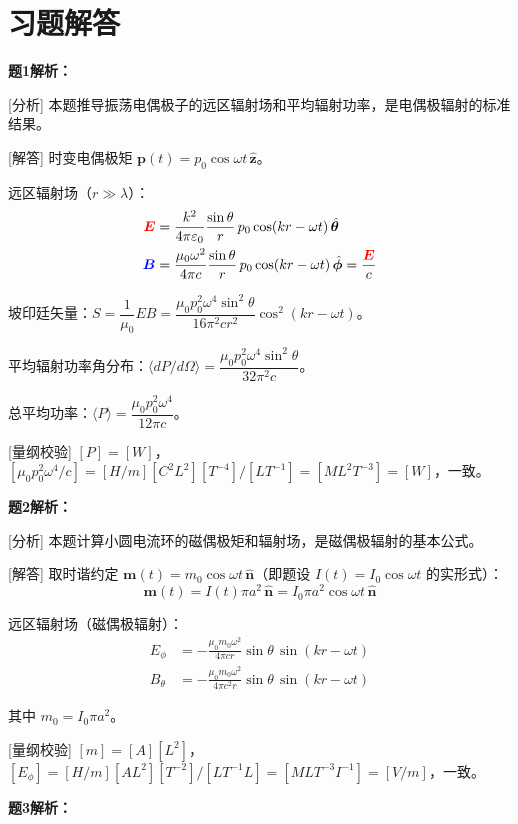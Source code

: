 \documentclass[11pt,a4paper,openany,oneside]{book}
\newcommand{\vecE}{\textcolor{red}{\vect{E}}}
\newcommand{\vecB}{\textcolor{blue}{\vect{B}}}
\newcommand{\eps}{\varepsilon}
\newcommand{\muz}{\mu_0}
\newcommand{\vect}[1]{\bm{#1}}
\newcommand{\unitvec}[1]{\hat{\vect{#1}}}
\begin{document}
\section*{习题解答}

\textbf{题1解析：}

[分析] 本题推导振荡电偶极子的远区辐射场和平均辐射功率，是电偶极辐射的标准结果。

[解答] 时变电偶极矩 $\vect{p}(t) = p_0\cos\omega t\,\unitvec{z}$。

远区辐射场（$r \gg \lambda$）：
\begin{align*}
\vecE &= \frac{k^2}{4\pi\eps_0}\frac{\sin\theta}{r}\,p_0\cos(kr - \omega t)\,\unitvec{\theta} \\
\vecB &= \frac{\muz\omega^2}{4\pi c}\frac{\sin\theta}{r}\,p_0\cos(kr - \omega t)\,\unitvec{\phi} = \frac{\vecE}{c}
\end{align*}

坡印廷矢量：$S = \dfrac{1}{\muz}EB = \dfrac{\muz p_0^2\omega^4\sin^2\theta}{16\pi^2 c r^2}\cos^2(kr - \omega t)$。

平均辐射功率角分布：$\langle dP/d\Omega \rangle = \dfrac{\muz p_0^2\omega^4\sin^2\theta}{32\pi^2 c}$。

总平均功率：$\langle P \rangle = \dfrac{\muz p_0^2\omega^4}{12\pi c}$。\qedsymbol

[量纲校验] $[P] = [W]$，$[\muz p_0^2\omega^4/c] = [H/m][C^2L^2][T^{-4}]/[LT^{-1}] = [ML^2T^{-3}] = [W]$，一致。\qedsymbol

\textbf{题2解析：}

[分析] 本题计算小圆电流环的磁偶极矩和辐射场，是磁偶极辐射的基本公式。

[解答] 取时谐约定 $\vect{m}(t) = m_0\cos\omega t\,\unitvec{n}$（即题设 $I(t)=I_0\cos\omega t$ 的实形式）：
\[
\vect{m}(t) = I(t)\pi a^2\,\unitvec{n} = I_0\pi a^2\cos\omega t\,\unitvec{n}
\]

远区辐射场（磁偶极辐射）：
\begin{align*}
E_\phi &= -\frac{\muz m_0\omega^2}{4\pi c r}\sin\theta\,\sin(kr - \omega t) \\
B_\theta &= -\frac{\muz m_0\omega^2}{4\pi c^2 r}\sin\theta\,\sin(kr - \omega t)
\end{align*}

其中 $m_0 = I_0\pi a^2$。\qedsymbol

[量纲校验] $[m] = [A][L^2]$，$[E_\phi] = [H/m][A L^2][T^{-2}]/[L T^{-1} L] = [MLT^{-3}I^{-1}] = [V/m]$，一致。\qedsymbol

\textbf{题3解析：}
\end{document}
